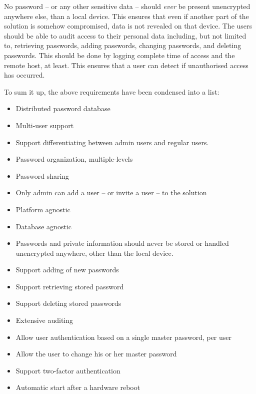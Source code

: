 			No password -- or any other sensitive data -- should \emph{ever} be present unencrypted anywhere else, than a local device. This ensures that even if another part of the solution is somehow compromised, data is not revealed on that device.  The users should be able to audit access to their personal data including, but not limited to, retrieving passwords, adding passwords, changing passwords, and deleting passwords. This should be done by logging complete time of access and the remote host, at least. This ensures that a user can detect if unauthorised access has occurred.

			To sum it up, the above requirements have been condensed into a list:
			\begin{itemize}
				\item Distributed password database
				\item Multi-user support
				\item Support differentiating between admin users and regular users.
				\item Password organization, multiple-levels
				\item Password sharing
				\item Only admin can add a user -- or invite a user -- to the solution
				\item Platform agnostic
				\item Database agnostic
				\item Passwords and private information should never be stored or handled unencrypted anywhere, other than the local device.
				\item Support adding of new passwords
				\item Support retrieving stored password
				\item Support deleting stored passwords
				\item Extensive auditing
				\item Allow user authentication based on a single master password, per user
				\item Allow the user to change his or her master password
				\item Support two-factor authentication
				\item Automatic start after a hardware reboot
			\end{itemize}


